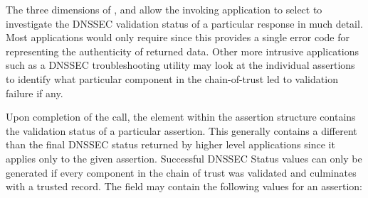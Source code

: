 The three dimensions of ,  and 
 allow the invoking application to select to 
investigate the DNSSEC validation status of a particular response in much detail. Most
applications would only require  since this provides a single
error code for representing the authenticity of returned data. Other
more intrusive applications such as a DNSSEC troubleshooting utility may
look at the individual assertions to identify what particular component
in the chain-of-trust led to validation failure if any.
                                                                                                                             
Upon completion of the  call, 
the  element within the assertion structure contains the validation
status of a particular assertion. This generally contains a different than the
final DNSSEC status returned by higher level applications since it applies only to 
the given assertion. Successful DNSSEC Status values can only be generated if every 
component in the chain of trust was validated and culminates with a trusted record.
The  field may contain the following values for an assertion:


